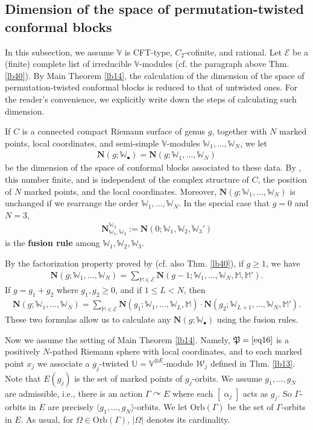 \documentclass[12pt,a4paper,notitlepage]{article}
\theoremstyle{definition}
\theoremstyle{plain}
\newcommand{\fk}{\mathfrak}
\newcommand{\mc}{\mathcal}
\newcommand{\bk}[1]{\langle {#1}\rangle}
\newcommand{\blt}{\bullet}
\newcommand{\Vbb}{\mathbb V}
\newcommand{\Ubb}{\mathbb U}
\newcommand{\Wbb}{\mathbb W}
\newcommand{\Mbb}{\mathbb M}
\newcommand{\Nbf}{\mathbf N}
\newcommand{\Orb}{\mathrm{Orb}}
\numberwithin{equation}{subsection}
\begin{document}
\begin{subappendices}
\subsection{Dimension of the space of permutation-twisted conformal blocks}\label{lb58}

In this subsection, we assume $\Vbb$ is CFT-type, $C_2$-cofinite, and rational. Let $\mc E$ be a (finite) complete list of irreducible $\Vbb$-modules (cf. the paragraph above Thm. \ref{lb40}). By Main Theorem \ref{lb14}, the calculation of the dimension of the space of permutation-twisted conformal blocks is reduced to that of untwisted ones. For the reader's convenience, we explicitly write down the steps of calculating such dimension.



If $C$ is a connected compact Riemann surface of genus $g$, together with $N$ marked points, local coordinates, and semi-simple  $\Vbb$-modules $\Wbb_1,\dots,\Wbb_N$, we let
\begin{align*}
\Nbf(g;\Wbb_\blt)=\Nbf(g;\Wbb_1,\dots,\Wbb_N)	 
\end{align*}
be the dimension of the space of conformal blocks associated to these data. By \cite{DGT19a,DGT19b}, this number finite, and  is independent of the complex structure of $C$, the position of $N$ marked points, and the local coordinates. Moreover, $\Nbf(g;\Wbb_1,\dots,\Wbb_N)$ is unchanged if we rearrange the order $\Wbb_1,\dots,\Wbb_N$. In the special case that $g=0$ and $N=3$,
\begin{align*}
\Nbf_{\Wbb_1,\Wbb_2}^{\Wbb_3}:=\Nbf(0;\Wbb_1,\Wbb_2,\Wbb_3')	
\end{align*}
is the \textbf{fusion rule} among $\Wbb_1,\Wbb_2,\Wbb_3$.

By the factorization property proved by \cite{DGT19b} (cf. also Thm. \ref{lb40}), if $g\geq 1$, we have
\begin{align}
\Nbf(g;\Wbb_1,\dots,\Wbb_N)=\sum_{\Mbb\in\mc E}\Nbf(g-1;\Wbb_1,\dots,\Wbb_N,\Mbb,\Mbb').	
\end{align}
If $g=g_1+g_2$ where $g_1,g_2\geq 0$, and if $1\leq L<N$, then
\begin{align}
\Nbf(g;\Wbb_1,\dots,\Wbb_N)=\sum_{\Mbb\in\mc E}\Nbf(g_1;\Wbb_1,\dots,\Wbb_L,\Mbb)\cdot\Nbf(g_2;\Wbb_{L+1},\dots,\Wbb_N,\Mbb').	
\end{align}	
These two formulas allow us to calculate any $\Nbf(g;\Wbb_\blt)$ using the fusion rules.


Now we assume the setting of Main Theorem \ref{lb14}. Namely, $\fk P=\eqref{eq16}$ is a positively  $N$-pathed Riemann sphere with local coordinates, and to each marked point $x_j$ we associate a $g_j$-twisted  $\Ubb=\Vbb^{\otimes E}$-module $\mc W_j$ defined in Thm. \ref{lb13}. Note that $E(g_j)$ is the set of marked points of $g_j$-orbits. We assume $g_1,\dots,g_N$ are admissible, i.e., there is an action $\Gamma\curvearrowright E$ where each $[\upalpha_j]$ acts as $g_j$. So $\Gamma$-orbits in $E$ are precisely $\bk{g_1,\dots,g_N}$-orbits. We let $\Orb(\Gamma)$ be the set of $\Gamma$-orbits in $E$. As usual, for $\Omega\in\Orb(\Gamma)$, $|\Omega|$ denotes its cardinality.




\end{subappendices}
\end{document}
